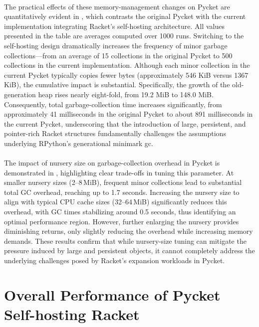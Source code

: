 		\paragraph{}%
			The practical effects of these memory-management changes on Pycket are quantitatively evident in , which contrasts the original Pycket with the current implementation integrating Racket's self-hosting architecture. All values presented in the table are averages computed over 1000 runs. Switching to the self-hosting design dramatically increases the frequency of minor garbage collections—from an average of 15 collections in the original Pycket to 500 collections in the current implementation. Although each minor collection in the current Pycket typically copies fewer bytes (approximately 546 KiB versus 1367 KiB), the cumulative impact is substantial. Specifically, the growth of the old-generation heap rises nearly eight-fold, from 19.2 MiB to 148.0 MiB. Consequently, total garbage-collection time increases significantly, from approximately 41 milliseconds in the original Pycket to about 891 milliseconds in the current Pycket, underscoring that the introduction of large, persistent, and pointer-rich Racket structures fundamentally challenges the assumptions underlying RPython's generational minimark \gls{gc}.


		\paragraph{}%
			The impact of nursery size on garbage-collection overhead in Pycket is demonstrated in , highlighting clear trade-offs in tuning this parameter. At smaller nursery sizes (2--8\,MiB), frequent minor collections lead to substantial total GC overhead, reaching up to 1.7 seconds. Increasing the nursery size to align with typical CPU cache sizes (32--64\,MiB) significantly reduces this overhead, with GC times stabilizing around 0.5 seconds, thus identifying an optimal performance region. However, further enlarging the nursery provides diminishing returns, only slightly reducing the overhead while increasing memory demands. These results confirm that while nursery-size tuning can mitigate the pressure induced by large and persistent objects, it cannot completely address the underlying challenges posed by Racket's expansion workloads in Pycket.

	\section[\texorpdfstring{Overall Performance of Pycket Self-hosting Racket}{Overall Performance}]{Overall Performance of Pycket Self-hosting Racket}
	\label{section:cross-benchmarks}


